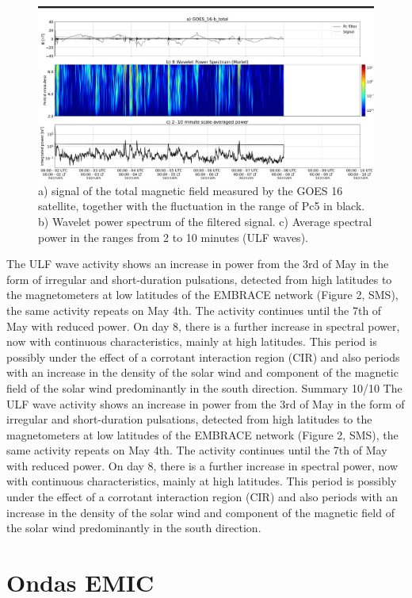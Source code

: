 \documentclass[a4paper, 10pt]{article}
\begin{document}
                     \begin{figure}[H]
    
                        \centering
   
                             \includegraphics[width=14cm]{./figures//figureULF_2.png}

                             \caption{a) signal of the total magnetic field 
                              measured by the GOES 16 satellite, together with the 
                              fluctuation in the range of Pc5 in black. b) Wavelet 
                              power spectrum of the filtered signal. c) Average 
                              spectral power in the ranges from 2 to 10 minutes 
                              (ULF waves).}
                        \end{figure}

                     The ULF wave activity shows an increase in power from the 3rd of May in
the form of irregular and short-duration pulsations, detected from high
latitudes to the magnetometers at low latitudes of the EMBRACE network
(Figure 2, SMS), the same activity repeats on May 4th. The activity continues
until the 7th of May with reduced power. On day 8, there is a further
increase in spectral power, now with continuous characteristics, mainly at
high latitudes. This period is possibly under the effect of a corrotant
interaction region (CIR) and also periods with an increase in the density of
the solar wind and component of the magnetic field of the solar wind
predominantly in the south direction.
Summary
10/10
The ULF wave activity shows an increase in power from the 3rd of May in the form of irregular and short-duration pulsations, detected from high latitudes to the magnetometers at low latitudes of the EMBRACE network (Figure 2, SMS), the same activity repeats on May 4th. The activity continues until the 7th of May with reduced power. On day 8, there is a further increase in spectral power, now with continuous characteristics, mainly at high latitudes. This period is possibly under the effect of a corrotant interaction region (CIR) and also periods with an increase in the density of the solar wind and component of the magnetic field of the solar wind predominantly in the south direction.\section{Ondas EMIC} 
\end{document}
